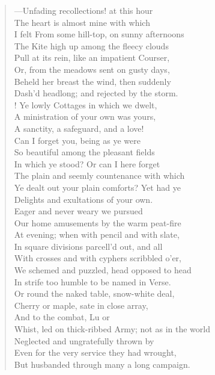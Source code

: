 \begin{verse}
---Unfading recollections! at this hour  \\
The heart is almost mine with which  \\
I felt From some hill-top, on sunny afternoons  \\
The Kite high up among the fleecy clouds  \\
Pull at its rein, like an impatient Courser,	  \\
Or, from the meadows sent on gusty days,  \\
Beheld her breast the wind, then suddenly  \\
Dash'd headlong; and rejected by the storm.  \\!
Ye lowly Cottages in which we dwelt,  \\
A ministration of your own was yours,	  \\
A sanctity, a safeguard, and a love!  \\
Can I forget you, being as ye were  \\
So beautiful among the pleasant fields  \\
In which ye stood? Or can I here forget  \\
The plain and seemly countenance with which	  \\
Ye dealt out your plain comforts? Yet had ye  \\
Delights and exultations of your own.  \\
Eager and never weary we pursued  \\
Our home amusements by the warm peat-fire  \\
At evening; when with pencil and with slate,	  \\
In square divisions parcell'd out, and all  \\
With crosses and with cyphers scribbled o'er,  \\
We schemed and puzzled, head opposed to head  \\
In strife too humble to be named in Verse.  \\
Or round the naked table, snow-white deal,	  \\
Cherry or maple, sate in close array,  \\
And to the combat, Lu or  \\
Whist, led on thick-ribbed Army; not as in the world  \\
Neglected and ungratefully thrown by  \\
Even for the very service they had wrought,	  \\
But husbanded through many a long campaign.  \\

\end{verse}

